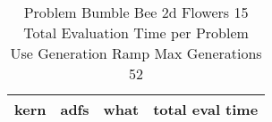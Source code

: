\begin{table}[H]
\caption{Problem  Bumble Bee 2d  Flowers 15\\Total Evaluation Time per Problem \\ Use Generation Ramp  Max Generations 52\\}
\begin{center}
\scalebox{1.0} %
{
\begin{tabular}{lllr}
\hline
kern & adfs & what & total eval time \\
\hline


\end{tabular}
}
\end{center}
\end{table}

